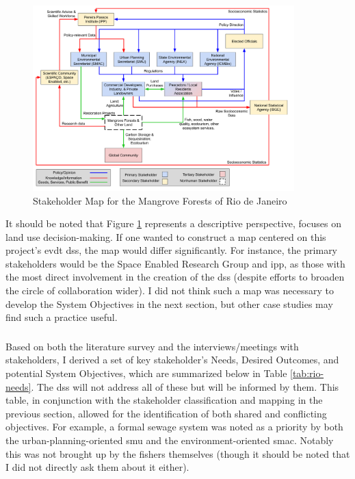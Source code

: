 \begin{figure}[!htb]
	\centering
	\includegraphics[width=0.9\textwidth]{Figures/chap4/Stakeholder_Map.png}
	\caption[Stakeholder Map for the Mangrove Forests of Rio de Janeiro]{Stakeholder Map for the Mangrove Forests of Rio de Janeiro}
	\label{fig:rio_stakemap}
\end{figure}

It should be noted that Figure \ref{fig:rio_stakemap} represents a descriptive perspective, focuses on land use decision-making. If one wanted to construct a map centered on this project's \ac{evdt} \ac{dss}, the map would differ significantly. For instance, the primary stakeholders would be the Space Enabled Research Group and \ac{ipp}, as those with the most direct involvement in the creation of the \ac{dss} (despite efforts to broaden the circle of collaboration wider). I did not think such a map was necessary to develop the System Objectives in the next section, but other case studies may find such a practice useful.

\subsubsection{}

Based on both the literature survey and the interviews/meetings with stakeholders, I derived a set of key stakeholder's Needs, Desired Outcomes, and potential System Objectives, which are summarized below in Table \ref{tab:rio-needs}. The \ac{dss} will not address all of these but will be informed by them. This table, in conjunction with the stakeholder classification and mapping in the previous section, allowed for the identification of both shared and conflicting objectives. For example, a formal sewage system was noted as a priority by both the urban-planning-oriented \ac{smu} and the environment-oriented \ac{smac}. Notably this was not brought up by the fishers themselves (though it should be noted that I did not directly ask them about it either). 

